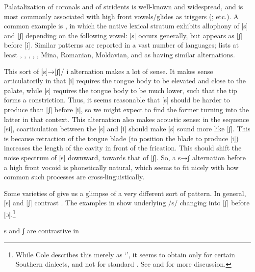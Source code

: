 Palatalization of coronals and of stridents is well-known and widespread, and is most commonly associated with high front vowels/glides as triggers (\citealt{Bateman:2007aa,Bateman2010,Kochetov2011}; etc.). A common example is , in which the native lexical stratum exhibits allophony of [s] and [ʃ] depending on the following vowel: [s] occurs generally, but appears as [ʃ] before [i]. Similar patterns are reported in a vast number of languages; \citet{Bateman:2007aa} lists at least , , ,  , , Mina, Romanian, Moldavian, and  as having similar alternations. \citep[from][]{Cole1955}

This sort of [s]→[ʃ]/ {\longrule} i alternation makes a lot of sense. It makes sense articulatorily in that [i] requires the tongue body to be elevated and close to the palate, while [s] requires the tongue body to be much lower, such that the tip forms a constriction. Thus, it seems reasonable that [s] should be harder to produce than [ʃ] before [i], so we might expect to find the former turning into the latter in that context. This alternation also makes acoustic sense: in the sequence [si], coarticulation between the [s] and [i] should make [s] sound more like [ʃ]. This is because retraction of the tongue blade (to position the blade to produce [i]) increases the length of the cavity in front of the frication. This should shift the noise spectrum of [s] downward, towards that of [ʃ]. So, a s→ʃ alternation before a high front vocoid is phonetically natural, which seems to fit nicely with how common such processes are cross-linguistically.

Some varieties of  give us a glimpse of a very different sort of pattern. In general, [s] and [ʃ] contrast . The examples in  show underlying /s/ changing into [ʃ] before [ɔ].\footnote{While Cole describes this merely as ‘’, it seems to obtain only for certain Southern dialects, and not for standard . See  and  for more discussion.}

\ea\label{ex:bennett:1}
s and ʃ are contrastive in  \citep[25]{Cole1955}\\
\z

\ea\label{ex:bennett:2}
\ea\label{ex:bennett:2a}
\ex\label{ex:bennett:2b} 
\ex\label{ex:bennett:2c} 
\z
\z

